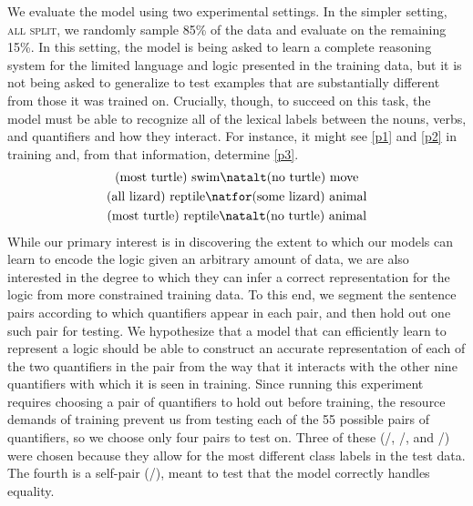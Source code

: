 We evaluate the model using two experimental settings. In the simpler
setting, \textsc{all split}, we randomly sample 85\% of the data and evaluate on the
remaining 15\%. In this setting, the model is being asked to learn a
complete reasoning system for the limited language and logic presented
in the training data, but it is not being asked to generalize to test
examples that are substantially different from those it was trained
on. Crucially, though, to succeed on this task, the model must be able
to recognize all of the lexical labels between the nouns, verbs,
and quantifiers and how they interact. For instance, it might see
\eqref{p1} and \eqref{p2} in training and, from that information,
determine \eqref{p3}.
%
%
\begin{gather}
  \text{(most turtle) swim} \natalt \text{(no turtle) move}\label{p1}
  \\
  \text{(all lizard) reptile} \natfor  \text{(some lizard) animal}\label{p2}
  \\
  \text{(most turtle) reptile} \natalt \text{(no turtle) animal}\label{p3}
\end{gather}
%
%
While our primary interest is in discovering the extent to which our
models can learn to encode the logic given an arbitrary amount of
data, we are also interested in the degree to which they can infer a
correct representation for the logic from more constrained training
data. To this end, we segment the sentence pairs according to which
quantifiers appear in each pair, and then hold out one such pair for
testing. We hypothesize that a model that can efficiently learn to
represent a logic should be able to construct an accurate
representation of each of the two quantifiers in the pair from the way that it
interacts with the other nine quantifiers with which it is seen in training. 
Since running this experiment requires choosing a pair of
quantifiers to hold out before training, the resource demands of
training prevent us from testing each of the 55 possible 
pairs of quantifiers, so we choose only four pairs to test on.  Three
of these (/, /, and
/) were chosen because they allow for the most
different class labels in the test data. The fourth is a
self-pair (/), meant to test that the model correctly
handles equality.

